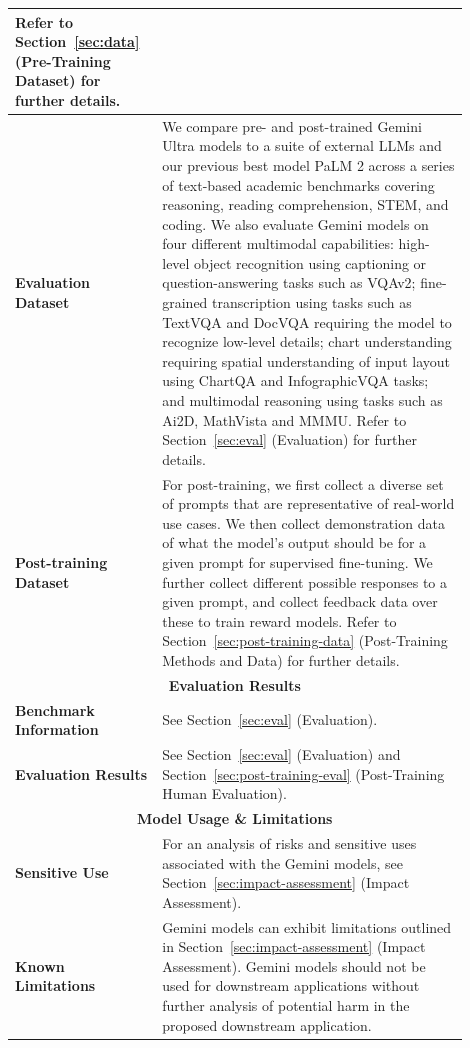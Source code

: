 \begin{longtable}{p{0.27\linewidth}p{0.63\linewidth}}
\newline
Refer to Section~\ref{sec:data} (Pre-Training Dataset) for further details. \\
\midrule
\textbf{Evaluation Dataset} & We compare pre- and post-trained Gemini Ultra models to a suite of external LLMs and our previous best model PaLM 2 across a series of text-based academic benchmarks covering reasoning, reading comprehension, STEM, and coding.
\newline
\newline
We also evaluate Gemini models on four different multimodal capabilities: high-level object recognition using captioning or question-answering tasks such as VQAv2; fine-grained transcription using tasks such as TextVQA and DocVQA requiring the model to recognize low-level details; chart understanding requiring spatial understanding of input layout using ChartQA and InfographicVQA tasks; and multimodal reasoning using tasks such as Ai2D, MathVista and MMMU.
\newline
\newline
Refer to Section~\ref{sec:eval} (Evaluation) for further details. \\
\midrule
\textbf{Post-training Dataset} & For post-training, we first collect a diverse set of prompts that are representative of real-world use cases. We then collect demonstration data of what the model's output should be for a given prompt for supervised fine-tuning. We further collect different possible responses to a given prompt, and collect feedback data over these to train reward models.
\newline
\newline
Refer to Section~\ref{sec:post-training-data} (Post-Training Methods and Data) for further details.  \\
\midrule
\multicolumn{2}{c}{\textbf{Evaluation Results}} \\
\midrule
\textbf{Benchmark Information} & See Section~\ref{sec:eval} (Evaluation). \\
\midrule
\textbf{Evaluation Results} & See Section~\ref{sec:eval} (Evaluation) and Section~\ref{sec:post-training-eval} (Post-Training Human Evaluation).\\
\midrule
\multicolumn{2}{c}{\textbf{Model Usage \& Limitations}} \\ \midrule
\textbf{Sensitive Use} & For an analysis of risks and sensitive uses associated with the Gemini models, see Section~\ref{sec:impact-assessment} (Impact Assessment). \\
\midrule
\textbf{Known Limitations} & Gemini models can exhibit limitations outlined in Section~\ref{sec:impact-assessment} (Impact Assessment). Gemini models should not be used for downstream applications without further analysis of potential harm in the proposed downstream application. \\

\end{longtable}
